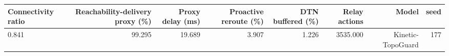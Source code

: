 \begin{tabular}{lrrrrrrr}
\toprule
Connectivity ratio & Reachability-delivery proxy (\%) & Proxy delay (ms) & Proactive reroute (\%) & DTN buffered (\%) & Relay actions & Model & seed \\
\midrule
0.841 & 99.295 & 19.689 & 3.907 & 1.226 & 3535.000 & Kinetic-TopoGuard & 177 \\
\bottomrule
\end{tabular}